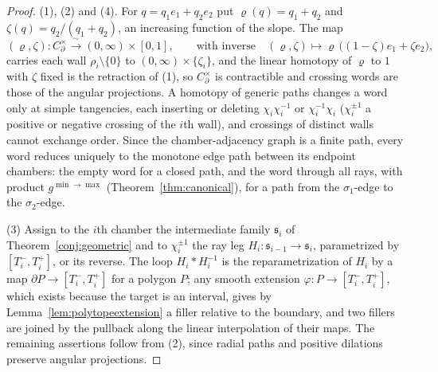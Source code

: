 \documentclass[11pt]{amsart}
\theoremstyle{definition}
\theoremstyle{remark}
\begin{document}
\begin{proof}
(1), (2) and (4).  For $q=q_1e_1+q_2e_2$ put $\varrho(q)=q_1+q_2$ and
$\zeta(q)=q_2/(q_1+q_2)$, an increasing function of the slope.  The map
\begin{equation}
\label{eq:sectorproduct}
 (\varrho,\zeta):C_\partial^\times\xrightarrow{\ \sim\ }(0,\infty)\times[0,1],
 \qquad\text{with inverse}\quad
 (\varrho,\zeta)\longmapsto \varrho\,\bigl((1-\zeta)e_1+\zeta e_2\bigr),
\end{equation}
carries each wall $\rho_i\setminus\{0\}$ to $(0,\infty)\times\{\zeta_i\}$, and
the linear homotopy of $\varrho$ to $1$ with $\zeta$ fixed is the retraction of
(1), so $C_\partial^\times$ is contractible and crossing words are those of the
angular projections.  A homotopy of generic
paths changes a word only at simple tangencies, each inserting or deleting
$\chi_i\chi_i^{-1}$ or $\chi_i^{-1}\chi_i$ ($\chi_i^{\pm1}$ a positive or
negative crossing of the $i$th wall), and crossings of distinct walls cannot
exchange order.  Since the chamber-adjacency graph is a finite path, every
word reduces uniquely to the monotone edge path between its endpoint chambers:
the empty word for a closed path, and the word through all rays, with product
$g^{\min\to\max}$ (Theorem~\ref{thm:canonical}), for a path from the
$\sigma_1$-edge to the $\sigma_2$-edge.

(3) Assign to the $i$th chamber the intermediate family $\mathfrak s_i$ of
Theorem~\ref{conj:geometric} and to $\chi_i^{\pm1}$ the ray leg
$H_i:\mathfrak s_{i-1}\to\mathfrak s_i$, parametrized by $[T_i^-,T_i^+]$, or
its reverse.  The loop $H_i*H_i^{-1}$ is the reparametrization of $H_i$ by a
map $\partial P\to[T_i^-,T_i^+]$ for a polygon $P$; any smooth extension
$\varphi:P\to[T_i^-,T_i^+]$, which exists because the target is an interval,
gives by Lemma~\ref{lem:polytopeextension} a filler
relative to the boundary, and two fillers are joined by the pullback along the
linear interpolation of their maps.  The remaining assertions follow from (2),
since radial paths and positive dilations preserve angular projections.
\end{proof}
\end{document}
